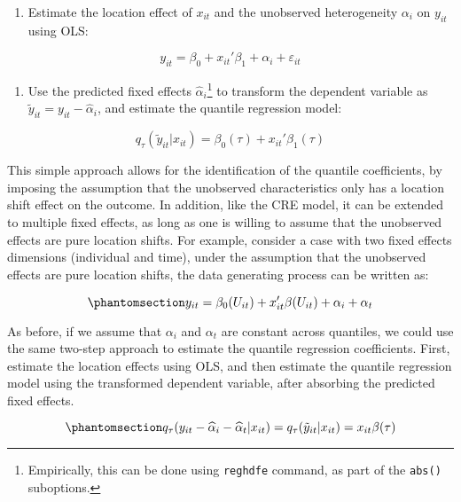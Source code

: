 \documentclass[bib]{statapress}
\providecommand{\tightlist}{%
  \setlength{\itemsep}{0pt}\setlength{\parskip}{0pt}}\usepackage{longtable,booktabs,array}
\begin{document}
\begin{enumerate}
\def\labelenumi{\arabic{enumi}.}
\tightlist
\item
  Estimate the location effect of \(x_{it}\) and the unobserved
  heterogeneity \(\alpha_i\) on \(y_{it}\) using OLS:
\end{enumerate}

\[y_{it}=\beta_0 +  x_{it}' \beta_1   +\alpha_i + \varepsilon_{it}
\]

\begin{enumerate}
\def\labelenumi{\arabic{enumi}.}
\setcounter{enumi}{1}
\tightlist
\item
  Use the predicted fixed effects \(\hat\alpha_i\)\footnote{Empirically,
    this can be done using \texttt{reghdfe} command, as part of the
    \texttt{abs()} suboptions.} to transform the dependent variable as
  \(\tilde y_{it}=y_{it}-\hat\alpha_i\), and estimate the quantile
  regression model:
\end{enumerate}

\[q_{\tau}(\tilde y_{it}|x_{it}) = \beta_0(\tau)+x_{it}'\beta_1(\tau)
\]

This simple approach allows for the identification of the quantile
coefficients, by imposing the assumption that the unobserved
characteristics only has a location shift effect on the outcome. In
addition, like the CRE model, it can be extended to multiple fixed
effects, as long as one is willing to assume that the unobserved effects
are pure location shifts. For example, consider a case with two fixed
effects dimensions (individual and time), under the assumption that the
unobserved effects are pure location shifts, the data generating process
can be written as:

\begin{equation}\phantomsection\label{eq-canay-dgp-2way}{y_{it} = \beta_0(U_{it}) + x_{it}'\beta(U_{it}) + \alpha_i + \alpha_t
}\end{equation}

As before, if we assume that \(\alpha_i\) and \(\alpha_t\) are constant
across quantiles, we could use the same two-step approach to estimate
the quantile regression coefficients. First, estimate the location
effects using OLS, and then estimate the quantile regression model using
the transformed dependent variable, after absorbing the predicted fixed
effects.

\begin{equation}\phantomsection\label{eq-canay-mway}{q_{\tau}(y_{it}-\hat \alpha_i - \hat \alpha_t|x_{it})=q_{\tau}(\tilde y_{it}|x_{it}) = x_{it}\beta(\tau)
}\end{equation}
\end{document}
